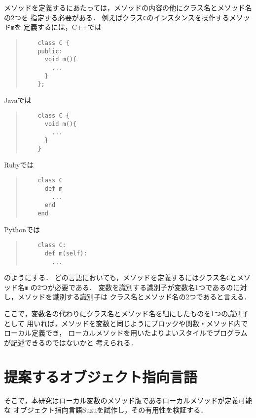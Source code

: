 \documentclass[a4paper,11pt,dvipdfmx]{jreport}
\begin{document}
メソッドを定義するにあたっては，メソッドの内容の他にクラス名とメソッド名の2つを
指定する必要がある．
例えばクラス\verb|C|のインスタンスを操作するメソッド\verb|m|を
定義するには，C++では
\begin{quote}
	\begin{verbatim}
	class C {
	public:
	  void m(){
	    ...
	  }
	};
	\end{verbatim}
\end{quote}
Javaでは
\begin{quote}
	\begin{verbatim}
	class C {
	  void m(){
	    ...
	  }
	}
	\end{verbatim}
\end{quote}
Rubyでは
\begin{quote}
	\begin{verbatim}
	class C
	  def m
	    ...
	  end
	end
	\end{verbatim}
\end{quote}
Pythonでは
\begin{quote}
	\begin{verbatim}
	class C:
	  def m(self):
	    ...
	\end{verbatim}
\end{quote}
のようにする．
どの言語においても，メソッドを定義するにはクラス名\verb|C|とメソッド名\verb|m|
の2つが必要である．
変数を識別する識別子が変数名1つであるのに対し，メソッドを識別する識別子は
クラス名とメソッド名の2つであると言える．

ここで，変数名の代わりにクラス名とメソッド名を組にしたものを1つの識別子として
用いれば，メソッドを変数と同じようにブロックや関数・メソッド内でローカル定義でき，
ローカルメソッドを用いたよりよいスタイルでプログラムが記述できるのではないかと
考えられる．


\section{提案するオブジェクト指向言語}

そこで，本研究はローカル変数のメソッド版であるローカルメソッドが定義可能な
オブジェクト指向言語Suzuを試作し，その有用性を検証する．
\end{document}
